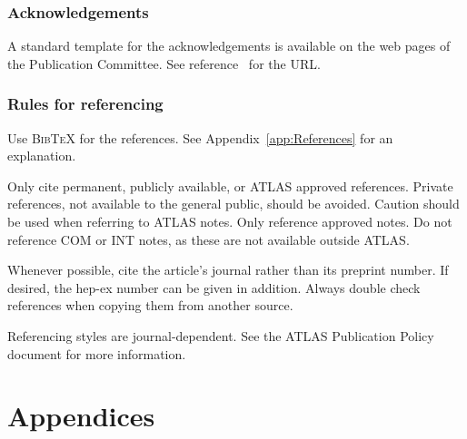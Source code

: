 \documentclass[11pt,a4paper]{../atlasnote}
\newcommand{\BibTeX}{\textsc{Bib\TeX}}
\begin{document}
%
%
\section{Acknowledgements}

A standard template for the acknowledgements is available on the
web pages of the Publication Committee.
See reference~\cite{publication_policy} for the URL. 

%
%
\section{Rules for referencing}

Use \BibTeX{} for the references. See Appendix~\ref{app:References}
for an explanation.

Only cite permanent, publicly available, or ATLAS approved references.
Private references, not available to the general public, should be
avoided. Caution should be used when referring to ATLAS notes.
Only reference approved notes. Do not reference COM or INT notes,
as these are not available outside ATLAS.

Whenever possible, cite the article's journal rather than its
preprint number. If desired, the hep-ex number can be given in
addition. Always double check references when copying them from
another source.

Referencing styles are journal-dependent. See the ATLAS Publication
Policy document for more information.






\newpage
\appendix
\part*{Appendices}
\end{document}
